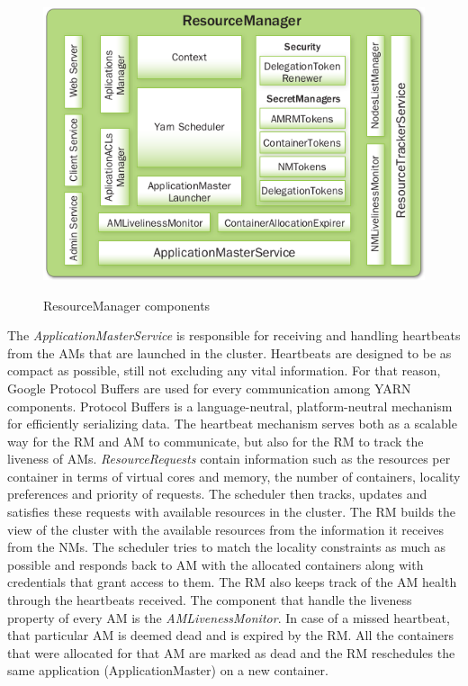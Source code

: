 \begin{figure}
\centering
\includegraphics[scale=0.6]{resources/images/Background/RM_components.png}
\label{fig:yarn_RM_components}
\caption{ResourceManager components \cite{Murthy:2014:AHY:2636998}}
\end{figure}

The \emph{ApplicationMasterService} is responsible for receiving and
handling heartbeats from the AMs that are launched in the
cluster. Heartbeats are designed to be as compact as possible, still
not excluding any vital information. For that reason, Google Protocol
Buffers \cite{proto_buf} are used for every communication among YARN
components. Protocol Buffers is a language-neutral, platform-neutral
mechanism for efficiently serializing data. The heartbeat mechanism
serves both as a scalable way for the RM and AM to communicate, but
also for the RM to track the liveness of AMs. \emph{ResourceRequests}
contain information such as the resources per container in terms of
virtual cores and memory, the number of containers, locality
preferences and priority of requests. The scheduler then tracks,
updates and satisfies these requests with available resources in the
cluster. The RM builds the view of the cluster with the available
resources from the information it receives from the NMs. The scheduler
tries to match the locality constraints as much as possible and
responds back to AM with the allocated containers along with
credentials that grant access to them. The RM also keeps track of the
AM health through the heartbeats received. The component that handle
the liveness property of every AM is the \emph{AMLivenessMonitor}. In
case of a missed heartbeat, that particular AM is deemed dead and
is expired by the RM. All the containers that were allocated for
that AM are marked as dead and the RM reschedules the same application
(ApplicationMaster) on a new container.

